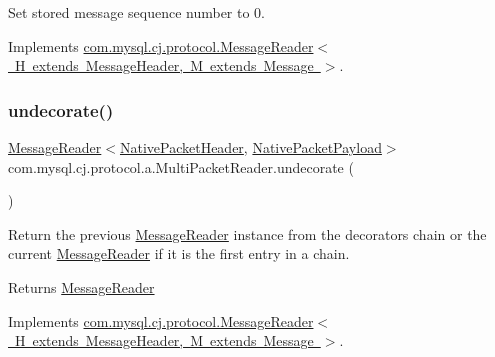 Set stored message sequence number to 0. 

Implements \mbox{\hyperlink{interfacecom_1_1mysql_1_1cj_1_1protocol_1_1_message_reader_a3161e55ab8c1bb4d533aa6d2700fb14d}{com.\+mysql.\+cj.\+protocol.\+Message\+Reader$<$ H extends Message\+Header, M extends Message $>$}}.

\mbox{\label{classcom_1_1mysql_1_1cj_1_1protocol_1_1a_1_1_multi_packet_reader_a88dba17bd898d3e8516fdb4a096297c5}} 
\subsubsection{\texorpdfstring{undecorate()}{undecorate()}}
{\footnotesize\ttfamily \mbox{\hyperlink{interfacecom_1_1mysql_1_1cj_1_1protocol_1_1_message_reader}{Message\+Reader}}$<$\mbox{\hyperlink{classcom_1_1mysql_1_1cj_1_1protocol_1_1a_1_1_native_packet_header}{Native\+Packet\+Header}}, \mbox{\hyperlink{classcom_1_1mysql_1_1cj_1_1protocol_1_1a_1_1_native_packet_payload}{Native\+Packet\+Payload}}$>$ com.\+mysql.\+cj.\+protocol.\+a.\+Multi\+Packet\+Reader.\+undecorate (\begin{DoxyParamCaption}{ }\end{DoxyParamCaption})}

Return the previous \mbox{\hyperlink{interfacecom_1_1mysql_1_1cj_1_1protocol_1_1_message_reader}{Message\+Reader}} instance from the decorators chain or the current \mbox{\hyperlink{interfacecom_1_1mysql_1_1cj_1_1protocol_1_1_message_reader}{Message\+Reader}} if it is the first entry in a chain.

\begin{DoxyReturn}{Returns}
\mbox{\hyperlink{interfacecom_1_1mysql_1_1cj_1_1protocol_1_1_message_reader}{Message\+Reader}} 
\end{DoxyReturn}


Implements \mbox{\hyperlink{interfacecom_1_1mysql_1_1cj_1_1protocol_1_1_message_reader_a59b0e118857c167ad4a270845f19e89b}{com.\+mysql.\+cj.\+protocol.\+Message\+Reader$<$ H extends Message\+Header, M extends Message $>$}}.

\mbox{\label{classcom_1_1mysql_1_1cj_1_1protocol_1_1a_1_1_multi_packet_reader_a2a1c000ea384788f1ef5d8add224d309}} 

